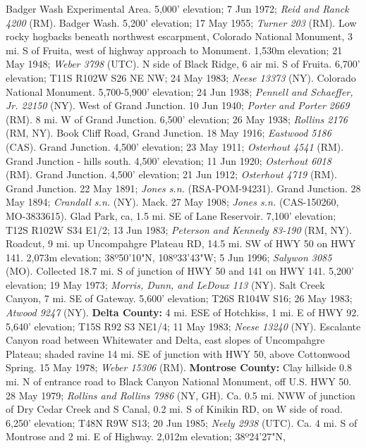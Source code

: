 Badger Wash Experimental Area. 5,000' elevation; 7 Jun 1972;
\textit{Reid and Ranck 4200} (RM).
Badger Wash. 5,200' elevation; 17 May 1955; \textit{Turner 203} (RM).
Low rocky hogbacks beneath northwest escarpment, Colorado National Monument,
3 mi. S of Fruita, west of highway approach to Monument. 1,530m elevation;
21 May 1948; \textit{Weber 3798} (UTC).
N side of Black Ridge, 6 air mi. S of Fruita. 6,700' elevation;
T11S R102W S26 NE NW; 24 May 1983; \textit{Neese 13373} (NY).
Colorado National Monument. 5,700-5,900' elevation; 24 Jun 1938;
\textit{Pennell and Schaeffer, Jr. 22150} (NY).
West of Grand Junction. 10 Jun 1940; \textit{Porter and Porter 2669} (RM).
8 mi. W of Grand Junction. 6,500' elevation;
26 May 1938; \textit{Rollins 2176} (RM, NY).
Book Cliff Road, Grand Junction. 18 May 1916; \textit{Eastwood 5186} (CAS).
Grand Junction. 4,500' elevation; 23 May 1911; \textit{Osterhout 4541} (RM).
Grand Junction - hills south. 4,500' elevation; 11 Jun 1920;
\textit{Osterhout 6018} (RM).
Grand Junction. 4,500' elevation; 21 Jun 1912; \textit{Osterhout 4719} (RM).
Grand Junction. 22 May 1891; \textit{Jones s.n.} (RSA-POM-94231).
Grand Junction. 28 May 1894; \textit{Crandall s.n.} (NY).
Mack. 27 May 1908; \textit{Jones s.n.} (CAS-150260, MO-3833615).
Glad Park, ca, 1.5 mi. SE of Lane Reservoir. 7,100' elevation;
T12S R102W S34 E1/2; 13 Jun 1983; \textit{Peterson and Kennedy 83-190} (RM, NY).
Roadcut, 9 mi. up Uncompahgre Plateau RD, 14.5 mi. SW of HWY 50 on HWY 141.
2,073m elevation; 38º50'10"N, 108º33'43"W; 5 Jun 1996;
\textit{Salywon 3085} (MO).
Collected 18.7 mi. S of junction of HWY 50 and 141 on HWY 141. 5,200' elevation;
19 May 1973; \textit{Morris, Dunn, and LeDoux 113} (NY).
Salt Creek Canyon, 7 mi. SE of Gateway. 5,600' elevation; T26S R104W S16;
26 May 1983; \textit{Atwood 9247} (NY).
  \textbf{Delta County:}
4 mi. ESE of Hotchkiss, 1 mi. E of HWY 92. 5,640' elevation; T15S R92 S3 NE1/4;
11 May 1983; \textit{Neese 13240} (NY).
Escalante Canyon road between Whitewater and Delta, east slopes of Uncompahgre
Plateau; shaded ravine 14 mi. SE of junction with HWY 50,
above Cottonwood Spring. 15 May 1978; \textit{Weber 15306} (RM).
  \textbf{Montrose County:}
Clay hillside 0.8 mi. N of entrance road to Black Canyon National Monument,
off U.S. HWY 50. 28 May 1979; \textit{Rollins and Rollins 7986} (NY, GH).
Ca. 0.5 mi. NWW of junction of Dry Cedar Creek and S Canal, 0.2 mi. S of
Kinikin RD, on W side of road. 6,250' elevation; T48N R9W S13; 20 Jun 1985;
\textit{Neely 2938} (UTC).
Ca. 4 mi. S of Montrose and 2 mi. E of Highway. 2,012m elevation; 38º24'27"N,
